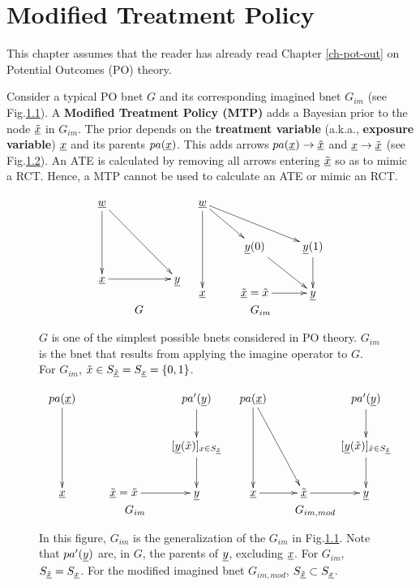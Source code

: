 \chapter{Modified Treatment Policy}
\label{ch-modi-treat}

This  chapter
assumes that the
reader has
already read
Chapter \ref{ch-pot-out} on Potential Outcomes (PO) theory.

Consider a typical PO bnet $G$
and its corresponding imagined bnet $G_{im}$ (see Fig.\ref{fig-modi-po}).
A {\bf Modified Treatment Policy (MTP)} adds a Bayesian prior to the
 node $\underline{{\tilde{x}}}$ in $G_{im}$.
The prior depends on the {\bf treatment
variable} (a.k.a., {\bf exposure variable}) ${\underline{x}}$ and its parents $pa({\underline{x}})$.
This adds arrows $pa({\underline{x}})\rightarrow\underline{{\tilde{x}}}$
and ${\underline{x}}\rightarrow \underline{{\tilde{x}}}$ (see Fig.\ref{fig-unmodi-modi}).
An ATE is calculated by removing all arrows entering $\underline{{\tilde{x}}}$
so as to mimic a RCT. Hence, a MTP cannot be used to calculate
an ATE or mimic an RCT.


\begin{figure}[h!]
$$
\begin{array}{cc}
\xymatrix{
\rvw
\ar[dd]\ar[ddrr]
\\
\\
\rvx \ar[rr]
&
&\rvy
}
&
\xymatrix{
\rvw
\ar[dd]\ar[dr] \ar[drr]
\\
& \rvy(0)\ar[dr]
&\rvy(1)\ar[d]
\\
\rvx
&\ul{\tilx}=\tilx\ar[r]
&\rvy
}
\\
G & G_{im}
\end{array}
$$
\caption{$G$ is one of the
simplest possible bnets considered in  PO theory.
$G_{im}$ is the bnet that results
from applying the imagine operator to $G$.
For $G_{im}$, ${\tilde{x}}\in S_{\underline{{\tilde{x}}}}=S_{\underline{x}}=\{0,1\}$.}
\label{fig-modi-po}
\end{figure}


\begin{figure}[h!]
$$
\begin{array}{cc}
\xymatrix{
pa(\rvx)
\ar[dd]
&
&pa'(\rvy)\ar[d]
\\
&&[\rvy(\tilx)]_{x\in S_{\ul{\tilx}}}\ar[d]
\\
\rvx
&\ul{\tilx}=\tilx\ar[r]
&\rvy
}
&
\xymatrix{
pa(\rvx)
\ar[dd]\ar[ddr]
&
&pa'(\rvy)\ar[d]
\\
&&[\rvy(\tilx)]_{\tilx\in S_{\ul{\tilx}}}\ar[d]
\\
\rvx\ar[r]
&\ul{\tilx}\ar[r]
&\rvy
}
\\
G_{im}
 &
G_{im,mod}
\end{array}
$$
\caption{In this figure, $G_{im}$
is the generalization of the $G_{im}$
in Fig.\ref{fig-modi-po}.
Note that $pa'({\underline{y}})$ are, in $G$, the parents of
${\underline{y}}$, excluding ${\underline{x}}$.
For $G_{im}$, $S_{\underline{{\tilde{x}}}}= S_{\underline{x}}$.
For the modified
imagined bnet $G_{im,mod}$, $S_{\underline{{\tilde{x}}}}\subset S_{\underline{x}}$. }
\label{fig-unmodi-modi}
\end{figure}


